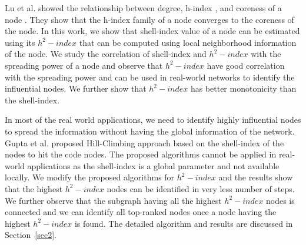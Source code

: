 \documentclass[12pt,3p]{article}
\begin{document}
Lu et al. showed the relationship between degree, h-index \cite{hirsch2005index}, and coreness of a node \cite{lu2016h}. They show that the h-index family of a node converges to the coreness of the node. In this work, we show that shell-index value of a node can be estimated using its $h^2-index$ that can be computed using local neighborhood information of the node. We study the correlation of shell-index and $h^2-index$ with the spreading power of a node and observe that $h^2-index$ have good correlation with the spreading power and can be used in real-world networks to identify the influential nodes. We further show that $h^2-index$ has better monotonicity than the shell-index. 



In most of the real world applications, we need to identify highly influential nodes to spread the information without having the global information of the network. Gupta et al. \cite{gupta2016pseudo} proposed Hill-Climbing approach based on the shell-index of the nodes to hit the code nodes. The proposed algorithms cannot be applied in real-world applications as the shell-index is a global parameter and not available locally. We modify the proposed algorithms for $h^2-index$ and the results show that the highest $h^2-index$ nodes can be identified in very less number of steps. We further observe that the subgraph having all the highest $h^2-index$ nodes is connected and we can identify all top-ranked nodes once a node having the highest $h^2-index$ is found. The detailed algorithm and results are discussed in Section~\ref{sec2}.
\end{document}
